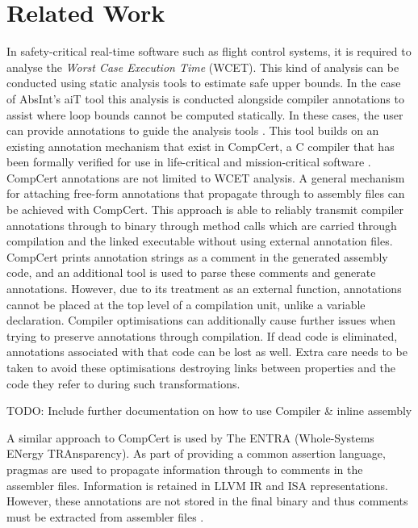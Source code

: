 \section{Related Work}
In safety-critical real-time software such as flight control systems, it is required to analyse the \textit{Worst Case Execution Time} (WCET). This kind of analysis can be conducted using static analysis tools to estimate safe upper bounds. In the case of AbsInt's aiT tool this analysis is conducted alongside compiler annotations to assist where loop bounds cannot be computed statically. In these cases, the user can provide annotations to guide the analysis tools \cite{schommer2018embedded}. This tool builds on an existing annotation mechanism that exist in CompCert, a C compiler that has been formally verified for use in life-critical and mission-critical software \cite{compcert}\cite{leroy2016compcert}. CompCert annotations are not limited to WCET analysis. A general mechanism for attaching free-form annotations that propagate through to assembly files can be achieved with CompCert. This approach is able to reliably transmit compiler annotations through to binary through method calls which are carried through compilation and the linked executable without using external annotation files. CompCert prints annotation strings as a comment in the generated assembly code, and an additional tool is used to parse these comments and generate annotations. However, due to its treatment as an external function, annotations cannot be placed at the top level of a compilation unit, unlike a variable declaration. Compiler optimisations can additionally cause further issues when trying to preserve annotations through compilation. If dead code is eliminated, annotations associated with that code can be lost as well. Extra care needs to be taken to avoid these optimisations destroying links between properties and the code they refer to during such transformations.

\label{sec:relatedWorkCompCert}
TODO: Include further documentation on how to use Compiler \& inline assembly

A similar approach to CompCert is used by The ENTRA (Whole-Systems ENergy TRAnsparency). As part of providing a common assertion language, pragmas are used to propagate information through to comments in the assembler files. Information is retained in LLVM IR and ISA representations. However, these annotations are not stored in the final binary and thus comments must be extracted from assembler files \cite{eder2013common}.

